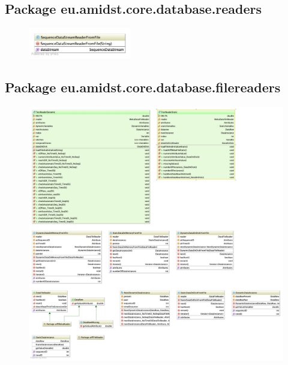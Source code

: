 \subsection{Package eu.amidst.core.database.readers}
\begin{figure}[H]
  \centering
    \includegraphics[width=0.4\textwidth]{ClassDiagrams/core_database_dynamics_readers.jpg}
\end{figure}

\subsection{Package eu.amidst.core.database.filereaders}
\begin{figure}[H]
  \centering
    \includegraphics[width=\textwidth]{ClassDiagrams/core_database_filereaders.jpg}
\end{figure}

